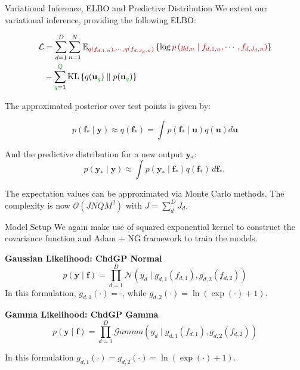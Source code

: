\begin{frame}{Variational Inference, ELBO and Predictive Distribution}
	We extent our variational inference, providing the following ELBO:
	
\begin{equation*}
	\begin{split}
	\mathcal{L} &= \sum_{d=1}^D \sum_{n=1}^{N} \mathbb{E}_{\textcolor{myred}{q(f_{d,1,n}), \cdots, q(f_{d,J_d,n})}} 
	\left\{ \log \textcolor{myred}{p\left( y_{d,n} \mid f_{d,1,n}, \cdots, f_{d,J_d,n} \right)} \right\} \\
	&- \sum_{{\textcolor{mygreen}{q}}=1}^{\textcolor{mygreen}{Q}} \text{KL}\left\{ q(\mathbf{u}_{\textcolor{mygreen}{q}}) \parallel p(\mathbf{u}_{\textcolor{mygreen}{q}}) \right\}
	\end{split}
\end{equation*}

The approximated posterior over test points is given by:

\begin{equation*}
	p(\mathbf{f}_* \mid \mathbf{y}) \approx q(\mathbf{f}_*) = \int p(\mathbf{f}_* \mid \mathbf{u}) q(\mathbf{u}) d\mathbf{u}
\end{equation*}

And the predictive distribution for a new output $\mathbf{y}_*$:
\begin{equation*}
	p(\mathbf{y}_* \mid \mathbf{y}) \approx \int p(\mathbf{y}_* \mid \mathbf{f}_*) q(\mathbf{f}_*) \, d\mathbf{f}_*,
\end{equation*}

The expectation values can be approximated via Monte Carlo methods. The complexity is now \textcolor{mygreen}{$\mathcal{O}(JNQM^2)$} with $J=\sum_d^D J_d$.
	
\end{frame}

\begin{frame}{Model Setup}
	We again make use of squared exponential kernel to construct the covariance function and Adam + NG framework to train the models.
		
	\begin{block}{\textbf{Gaussian Likelihood: ChdGP Normal}}
		\begin{equation*}
			p(\mathbf{y} \mid \mathbf{f}) = \prod_{d=1}^{D} \mathcal{N}\left(y_{d}\mid g_{d,1}(f_{d,1}), g_{d,2}(f_{d,2}) \right)
		\end{equation*}
		In this formulation, \(g_{d,1}(\cdot) = \cdot\), while \(g_{d,2}(\cdot) = \ln(\exp(\cdot) + 1)\).
	\end{block} 
	
	\begin{block}{\textbf{Gamma Likelihood: ChdGP Gamma}}
		\begin{equation*}
		p(\mathbf{y} \mid \mathbf{f}) = \prod_{d=1}^{D} \mathcal{G}amma\left( y_{d} \mid g_{d,1}(f_{d,1}), g_{d,2}(f_{d,2}) \right)
		\end{equation*}
		
		In this formulation \(g_{d,1}(\cdot) = g_{d,2}(\cdot) = \ln(\exp(\cdot) + 1)\).
	\end{block}
		
\end{frame}

